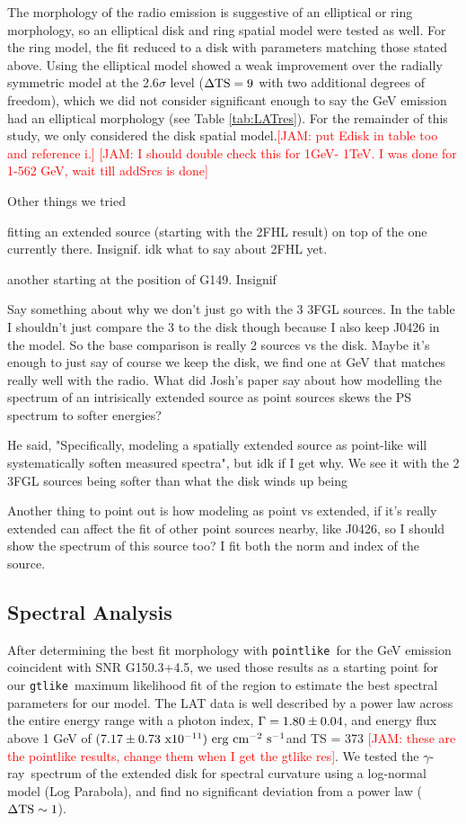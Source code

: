 \documentclass[preprint2]{aastex}
\newcommand{\kibitz}[2]{\ifnum\Comments=1\textcolor{#1}{#2}\fi}
\newcommand{\jamie}[1]{\kibitz{red}      {[JAM: #1]}}
\newcommand{\gam}{$\gamma$-ray}
\newcommand{\ptlike}{{\tt pointlike}}
\newcommand{\gtlike}{{\tt gtlike}}
\newcommand{\Gone}{G150.3+4.5}
\begin{document}
The morphology of the radio emission is suggestive of an elliptical or ring morphology, so an elliptical disk and ring spatial model were tested as well. For the ring model, the fit reduced to a disk with parameters matching those stated above. Using the elliptical model showed a weak improvement over the radially symmetric model at the 2.6$\sigma$ level (${\rm \Delta TS = 9}$ with two additional degrees of freedom), which we did not consider significant enough to say the GeV emission had an elliptical morphology (see Table \ref{tab:LATres}). For the remainder of this study, we only considered the disk spatial model.\jamie{put Edisk in table too and reference i.}
\jamie{I should double check this for 1GeV- 1TeV. I was done for 1-562 GeV, wait till addSrcs is done}



Other things we tried

fitting an extended source (starting with the 2FHL result) on top of the one currently there. Insignif. idk what to say about 2FHL yet. 

another starting at the position of G149. Insignif


Say something about why we don't just go with the 3 3FGL sources. In the table I shouldn't just compare the 3 to the disk though because I also keep J0426 in the model. So the base comparison is really 2 sources vs the disk. Maybe it's enough to just say of course we keep the disk, we find one at GeV that matches really well with the radio. What did Josh's paper say about how modelling the spectrum of an intrisically extended source as point sources skews the PS spectrum to softer energies?

He said, "Specifically, modeling a spatially extended source as point-like will systematically soften measured spectra", but idk if I get why. We see it with the 2 3FGL sources being softer than what the disk winds up being

Another thing to point out is how modeling as point vs extended, if it's really extended can affect the fit of other point sources nearby, like J0426, so I should show the spectrum of this source too?  I fit both the norm and index of the source. 



\subsection{\label{sec:LATspec}Spectral Analysis}
After determining the best fit morphology with \ptlike~for the GeV emission coincident with SNR \Gone, we used those results as a starting point for our \gtlike~maximum likelihood fit of the region to estimate the best spectral parameters for our model. The LAT data is well described by a power law across the entire energy range with a photon index, ${\rm \Gamma = 1.80 \pm 0.04}$, and energy flux above 1 GeV of ${\rm (7.17 \pm 0.73~ x 10^{-11})~ erg~cm^{-2}~ s^{-1}}$and TS = 373 \jamie{these are the pointlike results, change them when I get the gtlike res}. We tested the \gam ~spectrum of the extended disk for spectral curvature using a log-normal model (Log Parabola), and find no significant deviation from a power law (${\rm \Delta TS \sim 1}$). 
\end{document}
